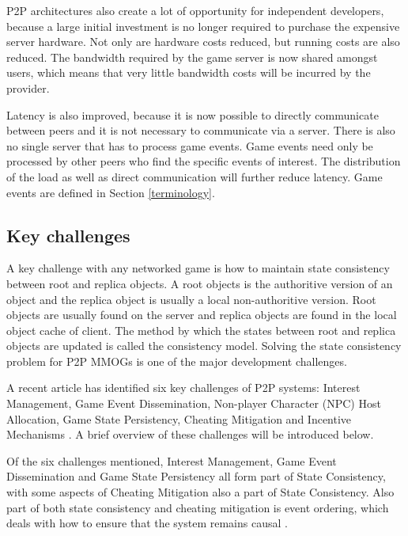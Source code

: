 \documentclass[10pt,a4paper,journal,cspaper,compsoc]{IEEEtran}
\begin{document}
P2P architectures also create a lot of opportunity for independent developers, because a large initial investment is no longer required to purchase
the expensive server hardware. Not only are hardware costs reduced, but running costs are also reduced. The bandwidth required by the game server is
now shared amongst users, which means that very little bandwidth costs will be incurred by the provider.

Latency is also improved, because it is now possible to directly communicate between peers and it is not necessary to communicate via a server. There
is also no single server that has to process game events. Game events need only be processed by other peers who find the specific events of interest.
The distribution of the load as well as direct communication will further reduce latency. Game events are defined in Section \ref{terminology}.

\subsection{Key challenges}
\label{key_challenges}

A key challenge with any networked game is how to maintain state consistency between root and replica objects. A root objects is the authoritive
version of an object and the replica object is usually a local non-authoritive version. Root objects are usually found on the server and replica
objects are found in the local object cache of client. The method by which the states between root and replica objects are updated is called the
consistency model. Solving the state consistency problem for P2P MMOGs is one of the major development challenges.

A recent article has identified six key challenges of P2P systems: Interest Management, Game Event Dissemination, Non-player Character (NPC) Host
Allocation, Game State Persistency, Cheating Mitigation and Incentive Mechanisms \cite{Fan_deisgn_issues_p2p}. A brief overview of these challenges
will be introduced below.

Of the six challenges mentioned, Interest Management, Game Event Dissemination and Game State Persistency all form part of State Consistency, with
some aspects of Cheating Mitigation also a part of State Consistency. Also part of both state consistency and cheating mitigation is event ordering,
which deals with how to ensure that the system remains causal \cite{GauthierDickey_low_latency_event_ordering}.
\end{document}
